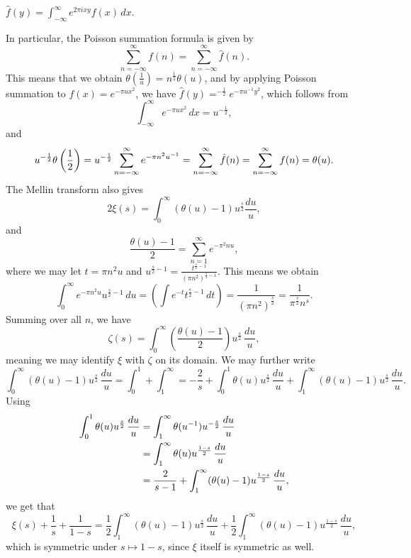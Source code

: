 \begin{definition}
    $\hat f(y) = \int_{-\infty}^\infty e^{2 \pi i x y} f(x) \, dx$.
\end{definition}
\noindent In particular, the Poisson summation formula is given by
\[ \sum_{n = -\infty}^\infty f(n) = \sum_{n=-\infty}^\infty \hat{f}(n). \]
This means that we obtain $\theta(\frac{1}{u}) = n^{\frac{1}{2}} \theta(u)$, and by applying Poisson summation to $f(x) = e^{-\pi u x^2}$, we have $\hat f(y) = ^{-\frac{1}{2}} e^{-\pi u^{-1} y^2}$, which follows from
\[ \int_{-\infty}^\infty e^{- \pi u x^2} \, dx = u^{-\frac{1}{2}}, \]
and
\[ u^{-\frac{1}{2}} \theta\left(\frac{1}{2}\right) = u^{-\frac{1}{2}} \sum_{n=-\infty}^\infty e^{-\pi n^2 u ^{-1}} = \sum_{n = -\infty}^\infty \hat f(n) = \sum_{n=-\infty}^\infty f(n) = \theta(u). \]
The Mellin transform also gives
\[ 2 \xi(s) = \int_0^\infty (\theta(u) - 1) u^{\frac{s}{2}} \frac{du}{u}, \]
and
\[ \frac{\theta(u) - 1}{2} = \sum_{n=1}^\infty e^{-\pi^2 n u}, \]
where we may let $t = \pi n^2 u$ and $u^{\frac{s}{2} - 1} = \frac{t^{\frac{s}{2} - 1}}{(\pi n^2)^{\frac{s}{2} - 1}}$. This means we obtain
\[ \int_0^\infty e^{-\pi n^2 u} u^{\frac{s}{2} - 1} \, du = \left(\int e^{-t} t^{\frac{s}{2} - 1} \, dt \right) = \frac{1}{(\pi n^2)^{\frac{s}{2}}} = \frac{1}{\pi^{\frac{s}{2}} n^s}. \]
Summing over all $n$, we have
\[ \zeta(s) = \int_0^\infty \left(\frac{\theta(u) - 1}{2}\right) u^{\frac{s}{2}} \, \frac{du}{u}, \]
meaning we may identify $\xi$ with $\zeta$ on its domain. We may further write
\[  \int_0^\infty (\theta(u) - 1) u^{\frac{s}{2}} \, \frac{du}{u} = \int_0^1 + \int_1^\infty = -\frac{2}{s} + \int_0^1 \theta(u) u^{\frac{s}{2}} \, \frac{du}{u} + \int_1^\infty (\theta(u) - 1) u^{\frac{s}{2}} \, \frac{du}{u}. \]
Using
\begin{align*}
    \int_0^1 \theta(u) u^{\frac{s}{2}} \, \frac{du}{u} &= \int_1^\infty \theta(u ^{-1}) u^{-\frac{s}{2}} \, \frac{du}{u} \\
    &= \int_1^\infty \theta(u) u^{\frac{1-s}{2}} \, \frac{du}{u} \\
    &= \frac{2}{s-1} + \int_1^\infty (\theta(u) - 1) u^{\frac{1-s}{2}} \, \frac{du}{u},
\end{align*}
we get that
\[ \xi(s) + \frac{1}{s} + \frac{1}{1-s} = \frac{1}{2} \int_1^\infty (\theta(u) - 1) u^{\frac{s}{2}} \, \frac{du}{u} + \frac{1}{2} \int_1^\infty (\theta(u) - 1) u^{\frac{1-s}{2}} \, \frac{du}{u}, \]
which is symmetric under $s \mapsto 1 - s$, since $\xi$ itself is symmetric as well.